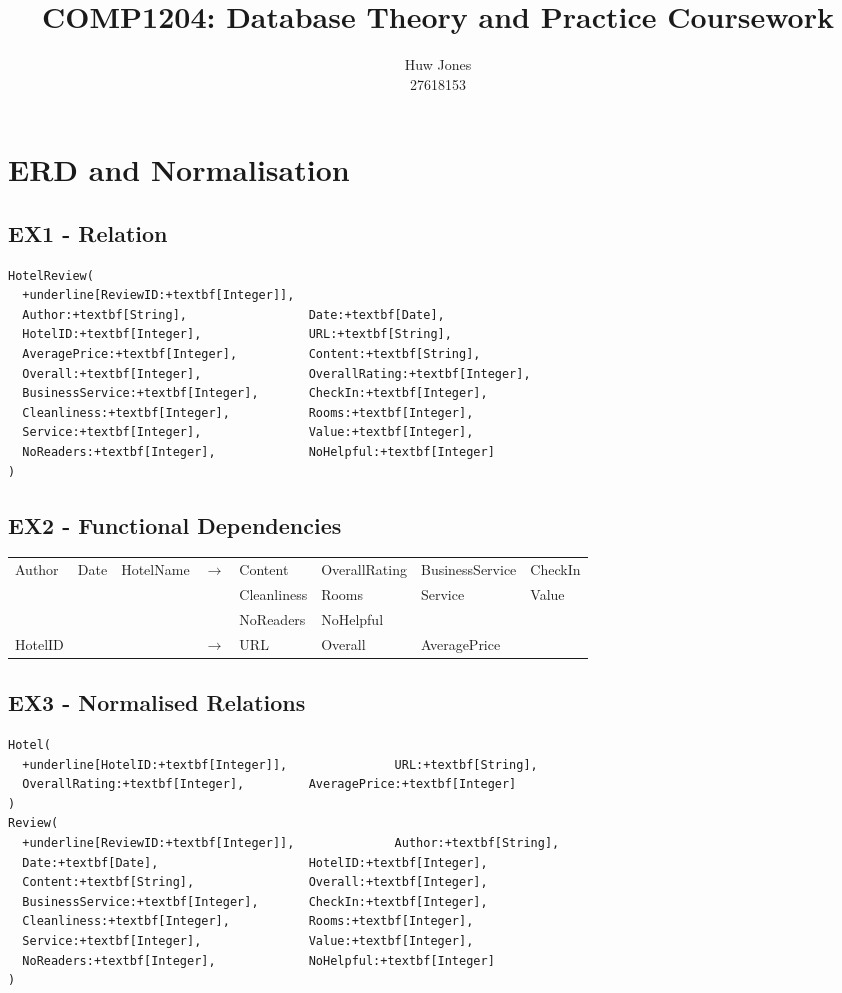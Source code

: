 \documentclass[a4paper]{article}
\author{Huw Jones \\27618153}
\title{COMP1204: Database Theory and Practice Coursework}
\begin{document}
\maketitle
\section{ERD and Normalisation}
\subsection{EX1 - Relation}
\begin{Verbatim}[commandchars=+\[\]]
HotelReview(
  +underline[ReviewID:+textbf[Integer]],
  Author:+textbf[String],                 Date:+textbf[Date],
  HotelID:+textbf[Integer],               URL:+textbf[String],
  AveragePrice:+textbf[Integer],          Content:+textbf[String],
  Overall:+textbf[Integer],               OverallRating:+textbf[Integer],
  BusinessService:+textbf[Integer],       CheckIn:+textbf[Integer],
  Cleanliness:+textbf[Integer],           Rooms:+textbf[Integer],
  Service:+textbf[Integer],               Value:+textbf[Integer],
  NoReaders:+textbf[Integer],             NoHelpful:+textbf[Integer]
)
\end{Verbatim}

\subsection{EX2 - Functional Dependencies}
\begin{tabular}{l l l c l l l l}
Author & Date & HotelName & $\to$ & Content & OverallRating & BusinessService & CheckIn \\
&&&& Cleanliness & Rooms & Service & Value \\
&&&& NoReaders & NoHelpful & & \\
HotelID & & & $\to$ & URL & Overall & AveragePrice & \\
\end{tabular}

\subsection{EX3 - Normalised Relations}
\begin{Verbatim}[commandchars=+\[\]]
Hotel(
  +underline[HotelID:+textbf[Integer]],               URL:+textbf[String],
  OverallRating:+textbf[Integer],         AveragePrice:+textbf[Integer]
)
Review(
  +underline[ReviewID:+textbf[Integer]],              Author:+textbf[String],
  Date:+textbf[Date],                     HotelID:+textbf[Integer],
  Content:+textbf[String],                Overall:+textbf[Integer],
  BusinessService:+textbf[Integer],       CheckIn:+textbf[Integer],
  Cleanliness:+textbf[Integer],           Rooms:+textbf[Integer],
  Service:+textbf[Integer],               Value:+textbf[Integer],
  NoReaders:+textbf[Integer],             NoHelpful:+textbf[Integer]
)
\end{Verbatim}
\end{document}
